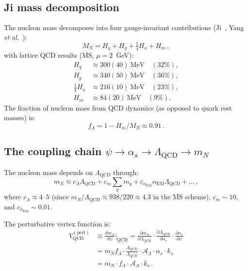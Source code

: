 \documentclass[aps,prd,twocolumn,superscriptaddress,floatfix,nofootinbib]{revtex4-2}
\newcommand{\LQCD}{\Lambda_{\mathrm{QCD}}}
\newcommand{\as}{\alpha_s}
\newcommand{\aem}{\alpha_{\mathrm{EM}}}
\newcommand{\mN}{m_N}
\newcommand{\ks}{k_s}
\begin{document}
\subsection{Ji mass decomposition}\label{sec:ji}

The nucleon mass decomposes into four gauge-invariant contributions
(Ji~\cite{Ji1995}, Yang \emph{et al.}~\cite{Yang2018}):
\begin{equation}
M_N = H_q + H_g + \tfrac{1}{4}H_a + H_m \, , \label{eq:ji_decomp}
\end{equation}
with lattice QCD results ($\overline{\mathrm{MS}}$, $\mu = 2$~GeV):
\begin{align}
H_q &\approx 300(40)~\text{MeV} \quad (32\%), \label{eq:Hq} \\
H_g &\approx 340(50)~\text{MeV} \quad (36\%), \label{eq:Hg} \\
\tfrac{1}{4}H_a &\approx 216(10)~\text{MeV} \quad (23\%), \label{eq:Ha} \\
H_m &\approx 84(20)~\text{MeV} \quad (9\%). \label{eq:Hm}
\end{align}
The fraction of nucleon mass from QCD dynamics (as opposed to quark rest
masses) is:
\begin{equation}
f_\Lambda = 1 - H_m/M_N \approx 0.91 \, . \label{eq:f_Lambda}
\end{equation}

\subsection{The coupling chain $\psi \to \as \to \LQCD \to \mN$}
\label{sec:coupling_chain}

The nucleon mass depends on $\LQCD$ through:
\begin{equation}
\mN \approx c_\Lambda \LQCD + c_m \sum_q m_q + c_\aem \aem \LQCD + \ldots \, ,
\label{eq:mN_LQCD}
\end{equation}
where $c_\Lambda \approx 4$--$5$ (since $\mN/\LQCD \approx 938/220 \approx 4.3$
in the $\overline{\mathrm{MS}}$ scheme), $c_m \sim 10$, and
$c_\aem \sim 0.01$.

The perturbative vertex function is:
\begin{align}
V_{\mathrm{QCD}}^{(\mathrm{pert})}
&\equiv \frac{d\mN}{d\psi}\bigg|_{\mathrm{QCD}}
= \frac{\partial \mN}{\partial \LQCD} \cdot
  \frac{\partial \LQCD}{\partial \as} \cdot
  \frac{\partial \as}{\partial \psi} \nonumber \\
&= \mN f_\Lambda \cdot
  \frac{\LQCD}{\LQCD} \cdot \mathcal{A}_\Lambda \cdot
  \as \cdot \ks \nonumber \\
&= \mN \cdot f_\Lambda \cdot \mathcal{A}_\Lambda \cdot \ks \, .
\label{eq:V_QCD_pert}
\end{align}
\end{document}

